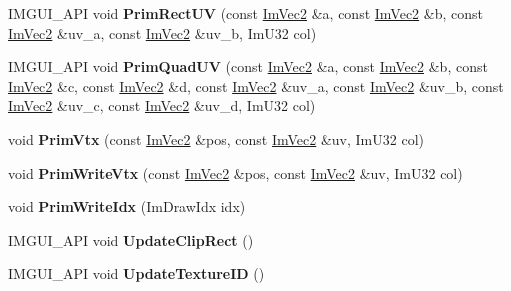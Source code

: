 \begin{DoxyCompactItemize}
\item 
\mbox{\label{struct_im_draw_list_adb963875428136a436a0faef556c810c}} 
I\+M\+G\+U\+I\+\_\+\+A\+PI void {\bfseries Prim\+Rect\+UV} (const \mbox{\hyperlink{struct_im_vec2}{Im\+Vec2}} \&a, const \mbox{\hyperlink{struct_im_vec2}{Im\+Vec2}} \&b, const \mbox{\hyperlink{struct_im_vec2}{Im\+Vec2}} \&uv\+\_\+a, const \mbox{\hyperlink{struct_im_vec2}{Im\+Vec2}} \&uv\+\_\+b, Im\+U32 col)
\item 
\mbox{\label{struct_im_draw_list_a9779645708cc70814f6caebaffdbf781}} 
I\+M\+G\+U\+I\+\_\+\+A\+PI void {\bfseries Prim\+Quad\+UV} (const \mbox{\hyperlink{struct_im_vec2}{Im\+Vec2}} \&a, const \mbox{\hyperlink{struct_im_vec2}{Im\+Vec2}} \&b, const \mbox{\hyperlink{struct_im_vec2}{Im\+Vec2}} \&c, const \mbox{\hyperlink{struct_im_vec2}{Im\+Vec2}} \&d, const \mbox{\hyperlink{struct_im_vec2}{Im\+Vec2}} \&uv\+\_\+a, const \mbox{\hyperlink{struct_im_vec2}{Im\+Vec2}} \&uv\+\_\+b, const \mbox{\hyperlink{struct_im_vec2}{Im\+Vec2}} \&uv\+\_\+c, const \mbox{\hyperlink{struct_im_vec2}{Im\+Vec2}} \&uv\+\_\+d, Im\+U32 col)
\item 
\mbox{\label{struct_im_draw_list_a405377158f0028ad8b4fb6509eef4532}} 
void {\bfseries Prim\+Vtx} (const \mbox{\hyperlink{struct_im_vec2}{Im\+Vec2}} \&pos, const \mbox{\hyperlink{struct_im_vec2}{Im\+Vec2}} \&uv, Im\+U32 col)
\item 
\mbox{\label{struct_im_draw_list_af86de4faf6c8e978fb712ea14c5d0c5f}} 
void {\bfseries Prim\+Write\+Vtx} (const \mbox{\hyperlink{struct_im_vec2}{Im\+Vec2}} \&pos, const \mbox{\hyperlink{struct_im_vec2}{Im\+Vec2}} \&uv, Im\+U32 col)
\item 
\mbox{\label{struct_im_draw_list_a42b72f87a0084c02f11dcd1560c8bbc7}} 
void {\bfseries Prim\+Write\+Idx} (Im\+Draw\+Idx idx)
\item 
\mbox{\label{struct_im_draw_list_af67bd4aeb1890f29d7cfb20ccd70ba44}} 
I\+M\+G\+U\+I\+\_\+\+A\+PI void {\bfseries Update\+Clip\+Rect} ()
\item 
\mbox{\label{struct_im_draw_list_ac545a766c5151d7beb449b61b2d84992}} 
I\+M\+G\+U\+I\+\_\+\+A\+PI void {\bfseries Update\+Texture\+ID} ()
\end{DoxyCompactItemize}
